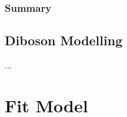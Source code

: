 \subsubsection{Summary}
%

%







\subsection{Diboson Modelling}


...




\section{Fit Model}\label{sec:vhbb_fit}

